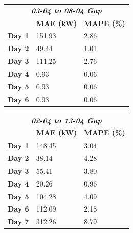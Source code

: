 \begin{table}[H]
	\begin{minipage}[t]{.45\textwidth}
		\begin{center}
			\begin{tabular}[c]{l|l|l}
				\multicolumn{3}{c}{\textbf{\textit{03-04 to 08-04 Gap}}}       \\
				               & \multicolumn{1}{c|}{\textbf{MAE (kW)}} &
				\multicolumn{1}{c}{\textbf{MAPE (\%)}}                         \\
				\hline
				\textbf{Day 1} & 151.93                                 & 2.86 \\
				\textbf{Day 2} & 49.44                                  & 1.01 \\
				\textbf{Day 3} & 111.25                                 & 2.76 \\
				\textbf{Day 4} & 0.93                                   & 0.06 \\
				\textbf{Day 5} & 0.93                                   & 0.06 \\
				\textbf{Day 6} & 0.93                                   & 0.06
			\end{tabular}
		\end{center}
	\end{minipage}%
	\hfill
	\begin{minipage}[t]{.45\textwidth}
		\begin{center}
			\begin{tabular}[c]{l|l|l}
				\multicolumn{3}{c}{\textbf{\textit{02-04 to 13-04 Gap}}}        \\
				                & \multicolumn{1}{c|}{\textbf{MAE (kW)}} &
				\multicolumn{1}{c}{\textbf{MAPE (\%)}}                          \\
				\hline
				\textbf{Day 1}  & 148.45                                 & 3.04 \\
				\textbf{Day 2}  & 38.14                                  & 4.28 \\
				\textbf{Day 3}  & 55.41                                  & 3.80 \\
				\textbf{Day 4}  & 20.26                                  & 0.96 \\
				\textbf{Day 5}  & 104.28                                 & 4.09 \\
				\textbf{Day 6}  & 112.09                                 & 2.18 \\
				\textbf{Day 7}  & 312.26                                 & 8.79 \\

\end{tabular}
\end{center}
\end{minipage}
\end{table}
